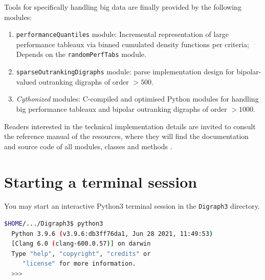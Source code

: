 \noindent Tools for specifically handling big data are finally provided by the following modules:

\begin{enumerate}[leftmargin=1cm]
\item \texttt{performanceQuantiles} module: Incremental representation of large performance tableaux via binned cumulated density functions per criteria; Depends on the \texttt{randomPerfTabs} module.
\item \texttt{sparseOutrankingDigraphs} module: parse implementation design for bipolar-valued outranking digraphs of order $> 500$.
\item \emph{Cythonized} modules: C-compiled and optimised Python modules for handling big performance tableaux and bipolar outranking digraphs of order $> 1000$.
\end{enumerate}

Readers interested in the technical implementation details are invited to consult the reference manual of the \Digraph resources, where they will find the documentation and source code of all \Digraph modules, classes and methods \cite{BIS-2021b}. 

\section{Starting a \Digraph terminal session}
\label{sec:1.3}
You may start an interactive Python3 terminal session in the \texttt{Digraph3} directory.
\begin{lstlisting}[language=sh, backgroundcolor=\color{White}, numbers=none]
  $HOME/.../Digraph3$ python3
  Python 3.9.6 (v3.9.6:db3ff76da1, Jun 28 2021, 11:49:53) 
  [Clang 6.0 (clang-600.0.57)] on darwin
  Type "help", "copyright", "credits" or 
     "license" for more information.
  >>>
\end{lstlisting}


